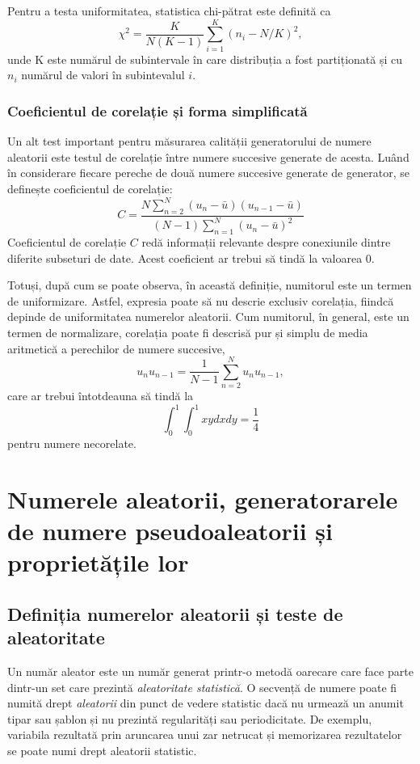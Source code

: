 Pentru a testa uniformitatea, statistica chi-pătrat este definită ca
\[
\chi^2 = \frac{K}{N(K-1)}\sum^K_{i=1}(n_i - N/K)^2,
\]
unde K este numărul de subintervale în care distribuția a fost partiționată și cu $n_i$ numărul de valori în subintevalul $i$.

\subsubsection{Coeficientul de corelație și forma simplificată}

Un alt test important pentru măsurarea calității generatorului de numere aleatorii este testul de corelație între numere succesive generate de acesta. Luând în considerare fiecare pereche de două numere succesive generate de generator, se definește coeficientul de corelație:
\[
C = \frac{N\sum^N_{n=2}(u_n-\bar{u})(u_{n-1}-\bar{u})}{(N-1)\sum^N_{n=1}(u_n-\bar{u})^2}
\]
Coeficientul de corelație $C$ redă informații relevante despre conexiunile dintre diferite subseturi de date. Acest coeficient ar trebui să tindă la valoarea 0.

Totuși, după cum se poate observa, în această definiție, numitorul este un  termen de uniformizare. Astfel, expresia poate să nu descrie exclusiv corelația, fiindcă depinde de uniformitatea numerelor aleatorii. Cum numitorul, în general, este un termen de normalizare, corelația poate fi descrisă pur și simplu de media aritmetică a perechilor de numere succesive,
\[
u_n u_{n-1} = \frac{1}{N-1}\sum^N_{n=2}u_n u_{n-1},
\]
care ar trebui întotdeauna să tindă la
\[
\int_0^1 \int_0^1 xydxdy = \frac{1}{4}
\]
pentru numere necorelate. 
\pagebreak
\section{Numerele aleatorii, generatorarele de numere pseudoaleatorii și proprietățile lor}
\subsection{Definiția numerelor aleatorii și teste de aleatoritate}
Un număr aleator este un număr generat printr-o metodă oarecare care face parte dintr-un set care prezintă \textit{aleatoritate statistică}. O secvență de numere poate fi numită drept \textit{aleatorii} din punct de vedere statistic dacă nu urmează un anumit tipar sau șablon și nu prezintă regularități sau periodicitate. De exemplu, variabila rezultată prin aruncarea unui zar netrucat și memorizarea rezultatelor se poate numi drept aleatorii statistic. 


